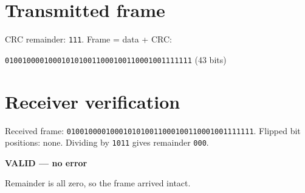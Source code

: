 \documentclass[11pt,a4paper]{article}
\begin{document}
\section{Transmitted frame}
CRC remainder: \texttt{111}. Frame = data + CRC:
\begin{center}\texttt{0100100001000101010011000100110001001111111} (43 bits)\end{center}

\section{Receiver verification}
Received frame: \texttt{0100100001000101010011000100110001001111111}. Flipped bit positions: none.
Dividing by \texttt{1011} gives remainder \texttt{000}.
\begin{center}\textbf{VALID --- no error}\end{center}
Remainder is all zero, so the frame arrived intact.
\end{document}
